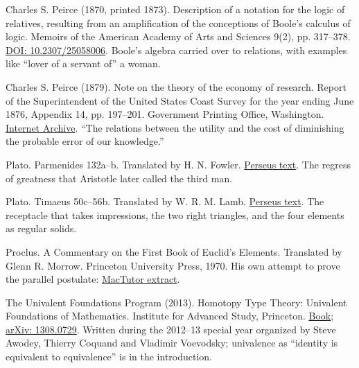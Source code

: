 \noindent Charles S. Peirce (1870, printed 1873). Description of a notation for the logic of relatives, resulting from an amplification of the conceptions of Boole's calculus of logic. Memoirs of the American Academy of Arts and Sciences 9(2), pp. 317--378. \href{https://doi.org/10.2307/25058006}{DOI: 10.2307/25058006}. Boole's algebra carried over to relations, with examples like ``lover of a servant of'' a woman.
\par\medskip

\noindent Charles S. Peirce (1879). Note on the theory of the economy of research. Report of the Superintendent of the United States Coast Survey for the year ending June 1876, Appendix 14, pp. 197--201. Government Printing Office, Washington. \href{https://archive.org/details/1876-us-coast-survey-report}{Internet Archive}. ``The relations between the utility and the cost of diminishing the probable error of our knowledge.''
\par\medskip

\noindent Plato. Parmenides 132a--b. Translated by H. N. Fowler. \href{https://www.perseus.tufts.edu/hopper/text?doc=Perseus:text:1999.01.0174:text=Parm.:section=132a}{Perseus text}. The regress of greatness that Aristotle later called the third man.
\par\medskip

\noindent Plato. Timaeus 50c--56b. Translated by W. R. M. Lamb. \href{https://www.perseus.tufts.edu/hopper/text?doc=Perseus:text:1999.01.0180}{Perseus text}. The receptacle that takes impressions, the two right triangles, and the four elements as regular solids.
\par\medskip

\noindent Proclus. A Commentary on the First Book of Euclid's Elements. Translated by Glenn R. Morrow. Princeton University Press, 1970. His own attempt to prove the parallel postulate: \href{https://mathshistory.st-andrews.ac.uk/Extras/Proclus_parallel_postulate/}{MacTutor extract}.
\par\medskip

\noindent The Univalent Foundations Program (2013). Homotopy Type Theory: Univalent Foundations of Mathematics. Institute for Advanced Study, Princeton. \href{https://homotopytypetheory.org/book/}{Book}; \href{https://arxiv.org/abs/1308.0729}{arXiv: 1308.0729}. Written during the 2012--13 special year organized by Steve Awodey, Thierry Coquand and Vladimir Voevodsky; univalence as ``identity is equivalent to equivalence'' is in the introduction.
\par\medskip


